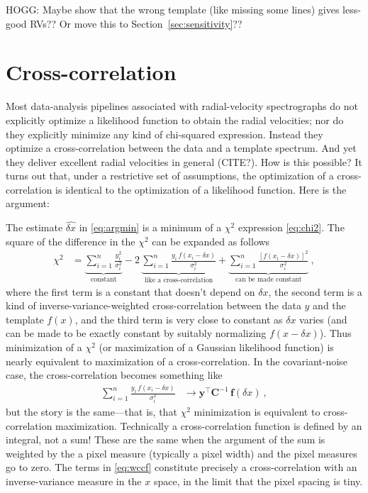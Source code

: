 \documentclass[modern]{aastex631}
\newcommand{\lao}[1]{\boldsymbol{#1}}
\newcommand{\vy}{\lao{y}}
\newcommand{\vf}{\lao{f}}
\newcommand{\vC}{\lao{C}}
\newcommand{\sectionname}{Section}
\newcommand{\secref}[1]{\sectionname~\ref{#1}}
\begin{document}
HOGG: Maybe show that the wrong template (like missing some lines) gives less-good RVs?? Or move this to \secref{sec:sensitivity}??

\section{Cross-correlation}\label{sec:ccf}

Most data-analysis pipelines associated with radial-velocity spectrographs do not explicitly optimize a likelihood function to obtain the radial velocities; nor do they explicitly minimize any kind of chi-squared expression.
Instead they optimize a cross-correlation between the data and a template spectrum.
And yet they deliver excellent radial velocities in general (CITE?).
How is this possible?
It turns out that, under a restrictive set of assumptions, the optimization of a cross-correlation is identical to the optimization of a likelihood function.
Here is the argument:

The estimate $\widehat{\delta x}$ in \eqref{eq:argmin} is a minimum of a $\chi^2$ expression \eqref{eq:chi2}.
The square of the difference in the $\chi^2$ can be expanded as follows
\begin{align}\label{eq:chi2ccf}
    \chi^2 &= \underbrace{\sum_{i=1}^n \frac{y_i^2}{\sigma_i^2}}_{\text{constant}}
         - 2\,\underbrace{\sum_{i=1}^n \frac{y_i\,f(x_i - \delta x)}{\sigma_i^2}}_{\text{like a cross-correlation}}
         +    \underbrace{\sum_{i=1}^n \frac{[f(x_i - \delta x)]^2}{\sigma_i^2}}_{\text{can be made constant}} ~,
\end{align}
where the first term is a constant that doesn't depend on $\delta x$,
the second term is a kind of inverse-variance-weighted cross-correlation between the data $y$ and the template $f(x)$,
and the third term is very close to constant as $\delta x$ varies (and can be made to be exactly constant by suitably normalizing $f(x-\delta x)$).
Thus minimization of a $\chi^2$ (or maximization of a Gaussian likelihood function) is nearly equivalent to maximization of a cross-correlation.
In the covariant-noise case, the cross-correlation becomes something like
\begin{align}
    \sum_{i=1}^n \frac{y_i\,f(x_i - \delta x)}{\sigma_i^2} &\rightarrow \vy^\top\vC^{-1}\,\vf(\delta x)\label{eq:wccf} ~,
\end{align}
but the story is the same---that is, that $\chi^2$ minimization is equivalent to cross-correlation maximization.
Technically a cross-correlation function is defined by an integral, not a sum!
These are the same when the argument of the sum is weighted by the a pixel measure (typically a pixel width) and the pixel measures  go to zero.
The terms in \eqref{eq:wccf} constitute precisely a cross-correlation with an inverse-variance measure in the $x$ space, in the limit that the pixel spacing is tiny.
\end{document}
